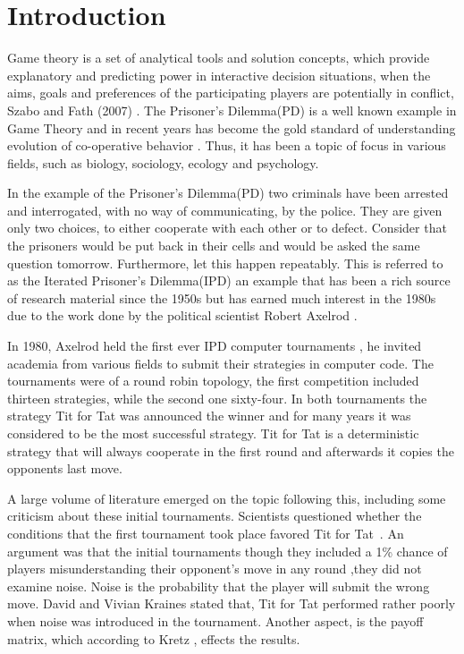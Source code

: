 \chapter{Introduction}
Game theory is a set of analytical tools and solution concepts, which provide
explanatory and predicting power in interactive decision situations, when the
aims, goals and preferences of the participating players are potentially in
conflict, Szabo and Fath (2007) \cite{Szabo2007}. The Prisoner's Dilemma(PD) is a well
known example in Game Theory and in recent years has become the gold standard of
understanding evolution of co-operative behavior \cite{Lorberbaum1994}.
Thus, it has been a topic of focus in various fields, such as biology,
sociology, ecology and psychology.

In the example of the Prisoner's Dilemma(PD) two criminals have been arrested
and interrogated, with no way of communicating, by the police. They are given
only two choices, to either cooperate with each other or to defect.
Consider that the prisoners would be put back in their cells and would be asked
the same question tomorrow. Furthermore, let this happen repeatably. This is
referred to as the Iterated Prisoner's Dilemma(IPD) an example that has been a
rich source of research material since the 1950s but has earned much interest in
the 1980s due to the work done by the political scientist Robert Axelrod
\cite{Axelrod1980a, Axelrod1980b, Axelrod1981}.

In 1980, Axelrod held the first ever IPD computer tournaments \cite{Axelrod1980a,
Axelrod1980b}, he invited
academia from various fields to submit their strategies in computer code. The
tournaments were of a round robin topology, the first competition included thirteen
strategies, while the second one sixty-four. In both tournaments the strategy Tit
for Tat was announced the winner and for many years it was considered to be the
most successful strategy. Tit for Tat is a deterministic strategy that will
always cooperate in the first round and afterwards it copies the opponents last
move.

A large volume of literature emerged on the topic following this, including some
criticism about these initial tournaments. Scientists questioned whether the
conditions that the first tournament took place favored Tit for Tat~\cite{RePEc:mtp:titles:0262023636}.
An argument was that the initial tournaments though they included
a 1\% chance of players misunderstanding their opponent's move in any round
,they did not examine noise. Noise is the probability
that the player will submit the wrong move. David and Vivian Kraines \cite{kraines-1989a}
stated that, Tit for Tat performed rather poorly when noise was introduced in the tournament.
Another aspect, is the payoff matrix, which according to Kretz \cite{Kretz2011},
effects the results.

